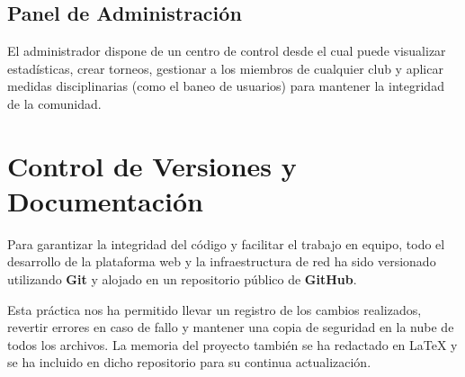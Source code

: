 \documentclass{article}
\begin{document}
\subsection{Panel de Administración}
El administrador dispone de un centro de control desde el cual puede visualizar estadísticas, crear torneos, gestionar a los miembros de cualquier club y aplicar medidas disciplinarias (como el baneo de usuarios) para mantener la integridad de la comunidad.

\section{Control de Versiones y Documentación}

Para garantizar la integridad del código y facilitar el trabajo en equipo, todo el desarrollo de la plataforma web y la infraestructura de red ha sido versionado utilizando \textbf{Git} y alojado en un repositorio público de \textbf{GitHub}. 

Esta práctica nos ha permitido llevar un registro de los cambios realizados, revertir errores en caso de fallo y mantener una copia de seguridad en la nube de todos los archivos. La memoria del proyecto también se ha redactado en \LaTeX{} y se ha incluido en dicho repositorio para su continua actualización.
\end{document}
